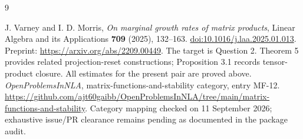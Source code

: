 \documentclass[11pt]{article}
\theoremstyle{remark}\newtheorem{remark}[theorem]{Remark}
\begin{document}
\begin{thebibliography}{9}\raggedright
{}
J. Varney and I. D. Morris,
\emph{On marginal growth rates of matrix products},
Linear Algebra and its Applications \textbf{709} (2025), 132--163.
\href{https://doi.org/10.1016/j.laa.2025.01.013}{doi:10.1016/j.laa.2025.01.013}.
Preprint: \url{https://arxiv.org/abs/2209.00449}.
The target is Question 2. Theorem 5 provides related projection-reset constructions; Proposition 3.1 records tensor-product closure. All estimates for the present pair are proved above.
\emph{OpenProblemsInNLA}, matrix-functions-and-stability category, entry MF-12.
\url{https://github.com/ajt60gaibb/OpenProblemsInNLA/tree/main/matrix-functions-and-stability}.
Category mapping checked on 11 September 2026; exhaustive issue/PR clearance remains pending as documented in the package audit.
\end{thebibliography}
\end{document}
